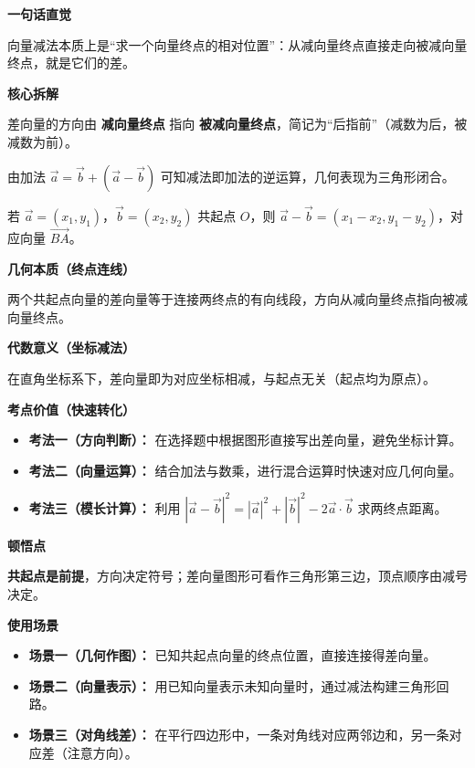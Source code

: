 \begin{explanationbox}

	\textbf{\textcolor{CExplanation}{一句话直觉}}

	向量减法本质上是“求一个向量终点的相对位置”：从减向量终点直接走向被减向量终点，就是它们的差。

	\medskip
	\textbf{\textcolor{CExplanation}{核心拆解}}
	\begin{description}[style=nextline, leftmargin=2.8em, labelsep=0.5em, itemsep=0.45em]
		\item[\textbf{要点一（方向规定）：}] 差向量的方向由 \textbf{减向量终点} 指向 \textbf{被减向量终点}，简记为“后指前”（减数为后，被减数为前）。
		\item[\textbf{要点二（加法逆运算）：}] 由加法 $\vec{a} = \vec{b} + (\vec{a}-\vec{b})$ 可知减法即加法的逆运算，几何表现为三角形闭合。
		\item[\textbf{要点三（坐标运算）：}] 若 $\vec{a}=(x_1,y_1)$，$\vec{b}=(x_2,y_2)$ 共起点 $O$，则 $\vec{a}-\vec{b}=(x_1-x_2,y_1-y_2)$，对应向量 $\overrightarrow{BA}$。
	\end{description}

	\medskip
	\textbf{\textcolor{CExplanation}{几何本质（终点连线）}}

	两个共起点向量的差向量等于连接两终点的有向线段，方向从减向量终点指向被减向量终点。

	\medskip
	\textbf{\textcolor{CExplanation}{代数意义（坐标减法）}}

	在直角坐标系下，差向量即为对应坐标相减，与起点无关（起点均为原点）。

	\medskip
	\textbf{\textcolor{CExplanation}{考点价值（快速转化）}}
	\begin{itemize}[leftmargin=*, itemsep=0.5em, topsep=0.4em]
		\item \textbf{考法一（方向判断）：} 在选择题中根据图形直接写出差向量，避免坐标计算。
		\item \textbf{考法二（向量运算）：} 结合加法与数乘，进行混合运算时快速对应几何向量。
		\item \textbf{考法三（模长计算）：} 利用 $|\vec{a}-\vec{b}|^2=|\vec{a}|^2+|\vec{b}|^2-2\vec{a}\cdot\vec{b}$ 求两终点距离。
	\end{itemize}

	\medskip
	\textbf{\textcolor{CExplanation}{顿悟点}}

	\textbf{共起点是前提}，方向决定符号；差向量图形可看作三角形第三边，顶点顺序由减号决定。

	\medskip
	\textbf{\textcolor{CExplanation}{使用场景}}
	\begin{itemize}[leftmargin=*, itemsep=0.5em, topsep=0.4em]
		\item \textbf{场景一（几何作图）：} 已知共起点向量的终点位置，直接连接得差向量。
		\item \textbf{场景二（向量表示）：} 用已知向量表示未知向量时，通过减法构建三角形回路。
		\item \textbf{场景三（对角线差）：} 在平行四边形中，一条对角线对应两邻边和，另一条对应差（注意方向）。
	\end{itemize}
\end{explanationbox}
